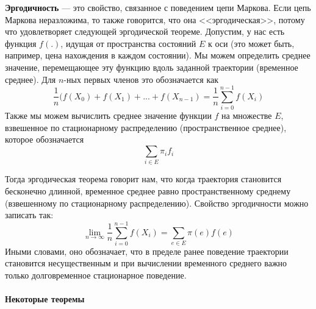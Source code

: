 \textbf{Эргодичность} — это свойство, связанное с поведением цепи Маркова. Если цепь Маркова неразложима, то также говорится, что она <<эргодическая>>, потому что удовлетворяет следующей эргодической теореме. Допустим, у нас есть функция $f(.)$, идущая от пространства состояний $E$ к оси (это может быть, например, цена нахождения в каждом состоянии). Мы можем определить среднее значение, перемещающее эту функцию вдоль заданной траектории (временное среднее). Для $n$-ных первых членов это обозначается как
\[
\frac{1}{n} ( f(X_0) + f(X_1) + ... + f(X_{n - 1} ) = \frac{1}{n} \sum_{i = 0}^{n - 1} f(X_i)
\]
Также мы можем вычислить среднее значение функции $f$ на множестве $E$, взвешенное по стационарному распределению (пространственное среднее), которое обозначается
\[
\sum_{i \in E} \pi_i f_i
\]

Тогда эргодическая теорема говорит нам, что когда траектория становится бесконечно длинной, временное среднее равно пространственному среднему (взвешенному по стационарному распределению). Свойство эргодичности можно записать так:
\[
\lim_{n \to \infty} \frac{1}{n} \sum_{i = 0}^{n - 1} f(X_i) = \sum_{e \in E} \pi(e) f(e)
\]
Иными словами, оно обозначает, что в пределе ранее поведение траектории становится несущественным и при вычислении временного среднего важно только долговременное стационарное поведение.

\paragraph{Некоторые теоремы}

